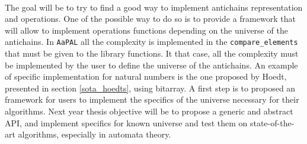 \documentclass[letterpaper]{article}
\theoremstyle{definition}
\begin{document}
\paragraph{}


The goal will be to try to find a good
way to implement antichains representation
and operations. One of the possible way to do so is to provide
a framework that will allow to implement
operations functions
depending on the universe of the antichains.
In \texttt{AaPAL} all the complexity
is implemented in the \texttt{compare\_elements} that must be given
to the library functions. It that case, all the complexity
must be implemented by the user to define the universe of the antichains.
An example of specific implementation for natural numbers is the one
proposed by Hoedt, presented in section \ref{sota_hoedts},
using bitarray. A first step
is to proposed an framework for users to implement the specifics of the
universe necessary for their algorithms. Next year thesis objective will
be to propose a generic and abstract API, and implement specifics
for known universe and test them on state-of-the-art algorithms,
especially in automata theory.






\end{document}
